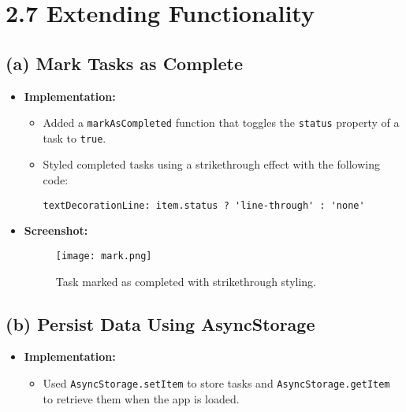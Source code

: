 \documentclass{article}
\begin{document}
\section*{2.7 Extending Functionality}

\subsection*{(a) Mark Tasks as Complete}
\begin{itemize}
    \item \textbf{Implementation:}
    \begin{itemize}
        \item Added a \texttt{markAsCompleted} function that toggles the \texttt{status} property of a task to \texttt{true}.
        \item Styled completed tasks using a strikethrough effect with the following code:
\begin{verbatim}
textDecorationLine: item.status ? 'line-through' : 'none'
\end{verbatim}
    \end{itemize}
    \item \textbf{Screenshot:}
    \begin{figure}[h!]
    \centering
    \texttt{[image: mark.png]}
    \caption{Task marked as completed with strikethrough styling.}
    \end{figure}
\end{itemize}

\subsection*{(b) Persist Data Using AsyncStorage}
\begin{itemize}
    \item \textbf{Implementation:}
    \begin{itemize}
        \item Used \texttt{AsyncStorage.setItem} to store tasks and \texttt{AsyncStorage.getItem} to retrieve them when the app is loaded.
    \end{itemize}
\end{itemize}
\end{document}

